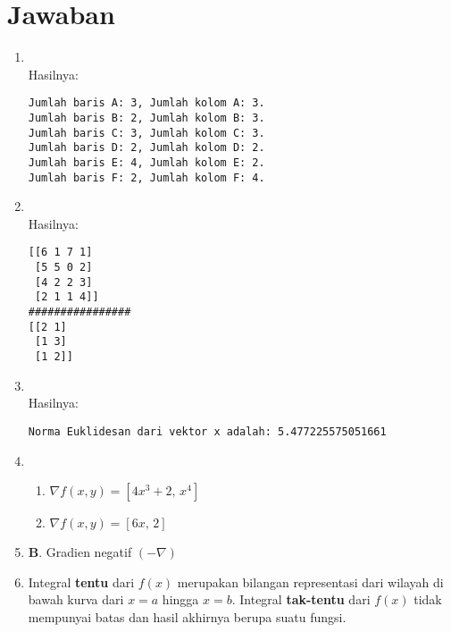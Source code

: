 \section{Jawaban}
\begin{enumerate}
\item\\

Hasilnya:
\begin{verbatim}
Jumlah baris A: 3, Jumlah kolom A: 3.
Jumlah baris B: 2, Jumlah kolom B: 3.
Jumlah baris C: 3, Jumlah kolom C: 3.
Jumlah baris D: 2, Jumlah kolom D: 2.
Jumlah baris E: 4, Jumlah kolom E: 2.
Jumlah baris F: 2, Jumlah kolom F: 4.
\end{verbatim}

\item\\

Hasilnya:
\begin{verbatim}
[[6 1 7 1]
 [5 5 0 2]
 [4 2 2 3]
 [2 1 1 4]]
################
[[2 1]
 [1 3]
 [1 2]]
\end{verbatim}

\item\\

Hasilnya:
\begin{verbatim}
Norma Euklidesan dari vektor x adalah: 5.477225575051661
\end{verbatim}

\item 
\begin{enumerate}[label=(\Alph*)]
    \item $\nabla f(x,y) = \left[4x^{3} + 2,\, x^{4}\right]$
    \item $\nabla f(x,y) = \left[6x,\, 2\right]$
\end{enumerate}

\item \textbf{B}. Gradien negatif $(-\nabla)$

\item Integral \textbf{tentu} dari $f(x)$ merupakan bilangan representasi dari wilayah di bawah kurva dari $x = a$ hingga $x = b$. Integral \textbf{tak-tentu} dari $f(x)$ tidak mempunyai batas dan hasil akhirnya berupa suatu fungsi.


\end{enumerate}
